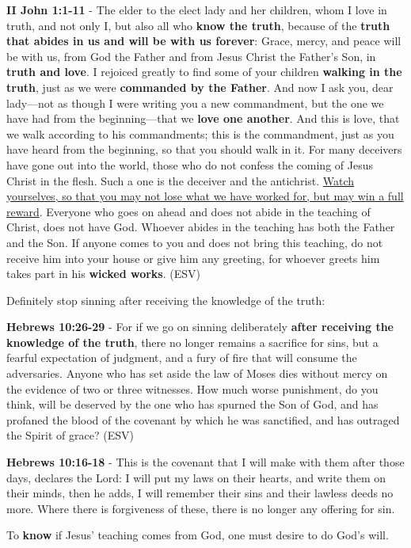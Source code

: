 \documentclass[11pt]{article}
\begin{document}
\textbf{II John 1:1-11} - The elder to the elect lady and her children, whom I love in truth, and not only I, but also all who \textbf{know the truth}, because of the \textbf{truth that abides in us and will be with us forever}: Grace, mercy, and peace will be with us, from God the Father and from Jesus Christ the Father's Son, in \textbf{truth and love}.  I rejoiced greatly to find some of your children \textbf{walking in the truth}, just as we were \textbf{commanded by the Father}.  And now I ask you, dear lady—not as though I were writing you a new commandment, but the one we have had from the beginning—that we \textbf{love one another}.  And this is love, that we walk according to his commandments; this is the commandment, just as you have heard from the beginning, so that you should walk in it.  For many deceivers have gone out into the world, those who do not confess the coming of Jesus Christ in the flesh. Such a one is the deceiver and the antichrist.  \uline{Watch yourselves, so that you may not lose what we have worked for, but may win a full reward}.  Everyone who goes on ahead and does not abide in the teaching of Christ, does not have God. Whoever abides in the teaching has both the Father and the Son.  If anyone comes to you and does not bring this teaching, do not receive him into your house or give him any greeting, for whoever greets him takes part in his \textbf{wicked works}. (ESV)

Definitely stop sinning after receiving the knowledge of the truth:

\textbf{Hebrews 10:26-29} - For if we go on sinning deliberately \textbf{after receiving the knowledge of the truth}, there no longer remains a sacrifice for sins, but a fearful expectation of judgment, and a fury of fire that will consume the adversaries. Anyone who has set aside the law of Moses dies without mercy on the evidence of two or three witnesses. How much worse punishment, do you think, will be deserved by the one who has spurned the Son of God, and has profaned the blood of the covenant by which he was sanctified, and has outraged the Spirit of grace? (ESV)

\textbf{Hebrews 10:16-18} - This is the covenant that I will make with them after those days, declares the Lord: I will put my laws on their hearts, and write them on their minds, then he adds, I will remember their sins and their lawless deeds no more. Where there is forgiveness of these, there is no longer any offering for sin.

To \textbf{know} if Jesus' teaching comes from God, one must desire to do God's will.
\end{document}
